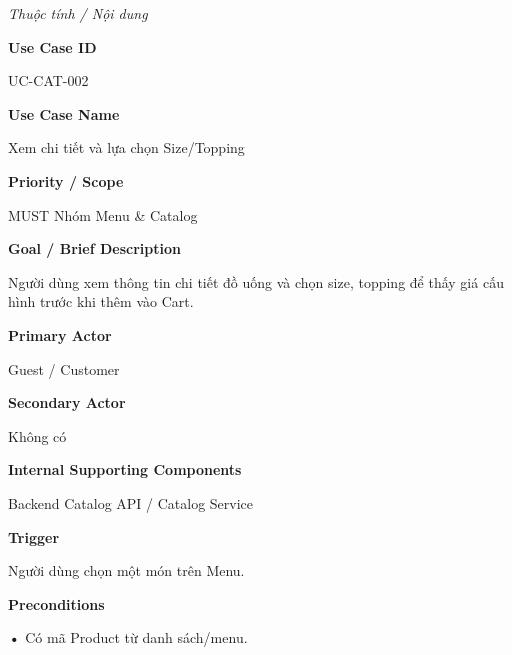 \documentclass[11pt,a4paper,oneside]{report}
\begin{document}

\par\noindent\textit{Thuộc tính / Nội dung}\par

\par\smallskip\noindent\textcolor{sgublue}{\textbf{Use Case ID}}\par\nobreak
UC-CAT-002
\par

\par\smallskip\noindent\textcolor{sgublue}{\textbf{Use Case Name}}\par\nobreak
Xem chi tiết và lựa chọn Size/Topping
\par

\par\smallskip\noindent\textcolor{sgublue}{\textbf{Priority / Scope}}\par\nobreak
MUST \textbar{} Nhóm Menu \& Catalog
\par

\par\smallskip\noindent\textcolor{sgublue}{\textbf{Goal / Brief Description}}\par\nobreak
Người dùng xem thông tin chi tiết đồ uống và chọn size, topping để thấy giá cấu hình trước khi thêm vào Cart.
\par

\par\smallskip\noindent\textcolor{sgublue}{\textbf{Primary Actor}}\par\nobreak
Guest / Customer
\par

\par\smallskip\noindent\textcolor{sgublue}{\textbf{Secondary Actor}}\par\nobreak
Không có
\par

\par\smallskip\noindent\textcolor{sgublue}{\textbf{Internal Supporting Components}}\par\nobreak
Backend Catalog API / Catalog Service
\par

\par\smallskip\noindent\textcolor{sgublue}{\textbf{Trigger}}\par\nobreak
Người dùng chọn một món trên Menu.
\par

\par\smallskip\noindent\textcolor{sgublue}{\textbf{Preconditions}}\par\nobreak
\textbf{•} Có mã Product từ danh sách/menu.
\end{document}

